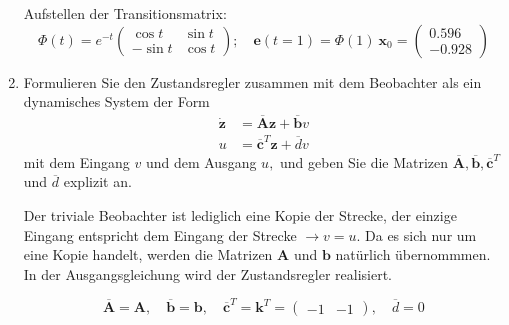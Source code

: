 \documentclass[crop=false]{standalone}
\begin{document}
\begin{task}
\begin{enumerate}[i]
\begin{solution}
 Aufstellen der Transitionsmatrix:
 \[ \Phi(t) = e^{-t} \begin{pmatrix} \cos{t} & \sin{t} \\ -\sin{t} & \cos{t}\end{pmatrix}; \quad \mathbf{e}(t=1) = \Phi(1) \ \mathbf{x}_0 = \begin{pmatrix}
 0.596\\-0.928
 \end{pmatrix}\]
 \end{solution}
 \item Formulieren Sie den Zustandsregler zusammen mit dem Beobachter als ein dynamisches System der Form
 \[ 
\begin{aligned} \dot{\mathbf{z}} &=\overline{\mathbf{A}} \mathbf{z}+\overline{\mathbf{b}} v \\ u &=\overline{\mathbf{c}}^{T} \mathbf{z}+\overline{d} v \end{aligned}
 \]
 mit dem Eingang $v$ und dem Ausgang $u,$ und geben Sie die Matrizen $\overline{\mathbf{A}}, \overline{\mathbf{b}}, \overline{\mathbf{c}}^{T}$
und $\overline{d}$ explizit an.
\begin{solution}
 Der triviale Beobachter ist lediglich eine Kopie der Strecke, der einzige Eingang entspricht dem Eingang der Strecke $\rightarrow v = u$. Da es sich nur um eine Kopie handelt, werden die Matrizen $\mathbf{A}$ und $\mathbf{b}$ natürlich übernommmen. In der Ausgangsgleichung wird der Zustandsregler realisiert.
 
 \[\overline{\mathbf{A}} = \mathbf{A}, \quad \overline{\mathbf{b}} = \mathbf{b}, \quad \overline{\mathbf{c}}^T = \mathbf{k}^T = \begin{pmatrix}-1 & -1\end{pmatrix}, \quad \overline{d} = 0 \]
\end{solution}
 \end{enumerate}
\end{task}
\end{document}
